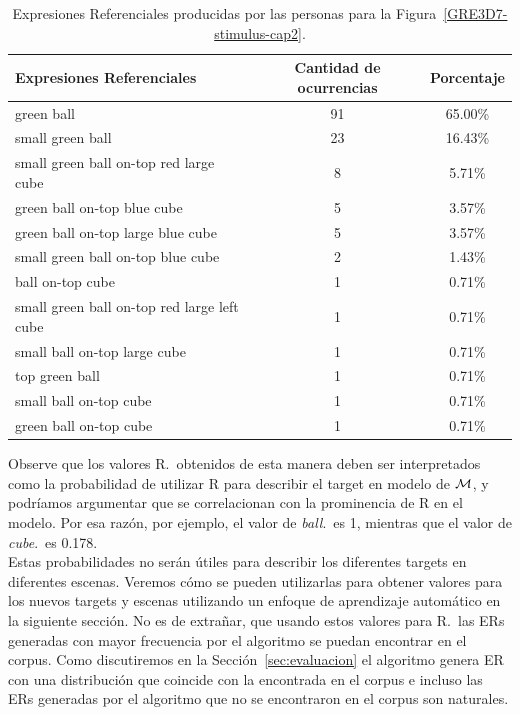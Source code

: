 \begin{table}[h!]
\begin{center}
\begin{tabular}{|l|c|c|}
\hline
Expresiones Referenciales & Cantidad de ocurrencias & Porcentaje \\
\hline

green ball & 91 & 65.00\% \\
small green ball   & 23 & 16.43\% \\
small green ball on-top red large cube & 8 & 5.71\% \\
green ball on-top blue cube & 5 & 3.57\% \\
green ball on-top large blue cube & 5 & 3.57\% \\
small green ball on-top blue cube & 2 & 1.43\% \\
ball on-top cube & 1 & 0.71\% \\
small green ball on-top red large left cube  & 1 & 0.71\% \\
small ball on-top large cube & 1 & 0.71\% \\
top green ball  & 1 & 0.71\% \\
small ball on-top cube & 1 & 0.71\% \\
green ball on-top cube & 1 & 0.71\% \\

\hline
\end{tabular}
\caption{Expresiones Referenciales producidas por las personas para la Figura~\ref{GRE3D7-stimulus-cap2}.}\label{corpus-distribution}
\end{center}
\end{table}

Observe que los valores R.\puse\ obtenidos de esta manera deben ser
interpretados como la probabilidad de utilizar R para describir el target en
modelo de $\mathcal{M} $, y podr\'{i}amos argumentar que se correlacionan con la
 prominencia de R en el modelo. Por esa raz\'on, por ejemplo, el
valor de \emph{ball}.\puse\ es 1, mientras que el valor de
\emph{cube}.\puse\ es 0.178. \\

Estas probabilidades no ser\'an \'utiles
para describir los diferentes targets en diferentes escenas. Veremos c\'omo se
pueden utilizarlas para obtener valores para los nuevos targets y escenas utilizando un
enfoque de aprendizaje autom\'atico en la siguiente secci\'on. No es de extra\~nar,
que usando estos valores para R.\puse\ las ERs generadas con mayor frecuencia por el
algoritmo se puedan encontrar en el corpus. Como discutiremos en la Secci\'on~\ref{sec:evaluacion} el algoritmo genera ER
con una distribuci\'on que coincide con la encontrada en el corpus e incluso las ERs generadas por el algoritmo que no se encontraron
en el corpus son naturales.



